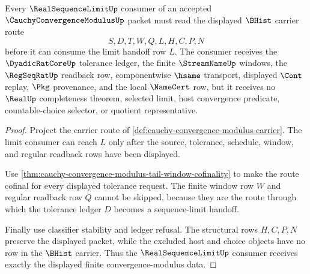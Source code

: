 \begin{theorem}
\label{thm:cauchy-convergence-modulus-real-sequence-limit-consumer}
Every $\RealSequenceLimitUp$ consumer of an accepted $\CauchyConvergenceModulusUp$ packet must read the displayed $\BHist$ carrier route
$$
S,D,T,W,Q,L,H,C,P,N
$$
before it can consume the limit handoff row $L$. The consumer receives the $\DyadicRatCoreUp$ tolerance ledger, the finite $\StreamNameUp$ windows, the $\RegSeqRatUp$ readback row, componentwise $\hsame$ transport, displayed $\Cont$ replay, $\Pkg$ provenance, and the local $\NameCert$ row, but it receives no $\RealUp$ completeness theorem, selected limit, host convergence predicate, countable-choice selector, or quotient representative.
\end{theorem}
\begin{proof}
Project the carrier route of \autoref{def:cauchy-convergence-modulus-carrier}. The limit consumer can reach $L$ only after the source, tolerance, schedule, window, and regular readback rows have been displayed.

Use \autoref{thm:cauchy-convergence-modulus-tail-window-cofinality} to make the route cofinal for every displayed tolerance request. The finite window row $W$ and regular readback row $Q$ cannot be skipped, because they are the route through which the tolerance ledger $D$ becomes a sequence-limit handoff.

Finally use classifier stability and ledger refusal. The structural rows $H,C,P,N$ preserve the displayed packet, while the excluded host and choice objects have no row in the $\BHist$ carrier. Thus the $\RealSequenceLimitUp$ consumer receives exactly the displayed finite convergence-modulus data.
\end{proof}

